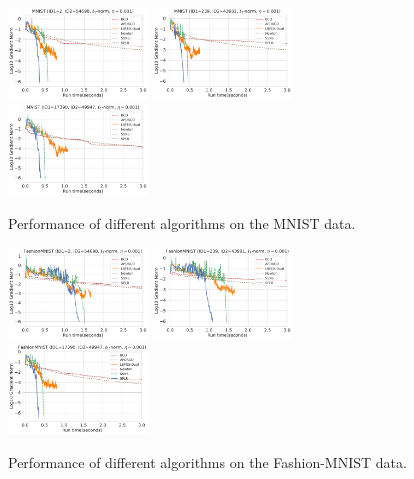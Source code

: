 \documentclass{article}
\theoremstyle{plain}
\theoremstyle{definition}
\theoremstyle{remark}
\begin{document}

\begin{figure}[p]
    \centering
    \includegraphics[width=0.33\textwidth]{save/MNIST/run_times/ID1=2, ID2=54698, norm=l1, reg=0.001}
    \includegraphics[width=0.33\textwidth]{save/MNIST/run_times/ID1=239, ID2=43981, norm=l1, reg=0.001}
    \includegraphics[width=0.33\textwidth]{save/MNIST/run_times/ID1=17390, ID2=49947, norm=l1, reg=0.001}
    \caption{Performance of different algorithms on the MNIST data.}
    \label{fig:mnist}
\end{figure}

\begin{figure}[htbp]
    \includegraphics[width=0.33\textwidth]{save/Fashion-MNIST/run_times/ID1=2, ID2=54698, norm=l1, reg=0.001}
    \includegraphics[width=0.33\textwidth]{save/Fashion-MNIST/run_times/ID1=239, ID2=43981, norm=l1, reg=0.001}
    \includegraphics[width=0.33\textwidth]{save/Fashion-MNIST/run_times/ID1=17390, ID2=49947, norm=l1, reg=0.001}
    \caption{Performance of different algorithms on the Fashion-MNIST data.}
    \label{fig:fashion-mnist}
\end{figure}
\end{document}
